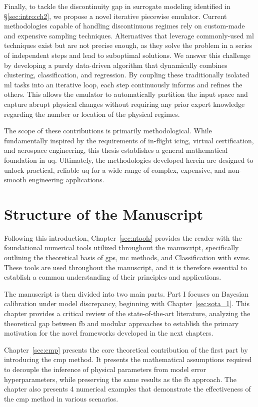 \smallskip
Finally, to tackle the discontinuity gap in surrogate modeling identified in \S\ref{sec:intro:ch2}, we propose a novel iterative piecewise emulator. Current methodologies capable of handling discontinuous regimes rely on custom-made and expensive sampling techniques. Alternatives that leverage commonly-used \gls{ml} techniques exist but are not precise enough, as they solve the problem in a series of independent steps and lead to suboptimal solutions. We answer this challenge by developing a purely data-driven algorithm that dynamically combines clustering, classification, and regression. By coupling these traditionally isolated \gls{ml} tasks into an iterative loop, each step continuously informs and refines the others. This allows the emulator to automatically partition the input space and capture abrupt physical changes without requiring any prior expert knowledge regarding the number or location of the physical regimes.

\smallskip
The scope of these contributions is primarily methodological. While fundamentally inspired by the requirements of in-flight icing, virtual certification, and aerospace engineering, this thesis establishes a general mathematical foundation in \gls{uq}. Ultimately, the methodologies developed herein are designed to unlock practical, reliable \gls{uq} for a wide range of complex, expensive, and non-smooth engineering applications.

\section{Structure of the Manuscript}
Following this introduction, Chapter~\ref{sec:ntools} provides the reader with the foundational numerical tools utilized throughout the manuscript, specifically outlining the theoretical basis of \glspl{gp}, \gls{mc} methods, and Classification with \glspl{svm}. These tools are used throughout the manuscript, and it is therefore essential to establish a common understanding of their principles and applications.

\smallskip
The manuscript is then divided into two main parts. Part I focuses on Bayesian calibration under model discrepancy, beginning with Chapter~\ref{sec:sota_1}. This chapter provides a critical review of the state-of-the-art literature, analyzing the theoretical gap between \gls{fb} and modular approaches to establish the primary motivation for the novel frameworks developed in the next chapters.

\smallskip
Chapter~\ref{sec:cmp} presents the core theoretical contribution of the first part by introducing the \gls{cmp} method. It presents the mathematical assumptions required to decouple the inference of physical parameters from model error hyperparameters, while preserving the same results as the \gls{fb} approach. The chapter also presents 4 numerical examples that demonstrate the effectiveness of the \gls{cmp} method in various scenarios.

